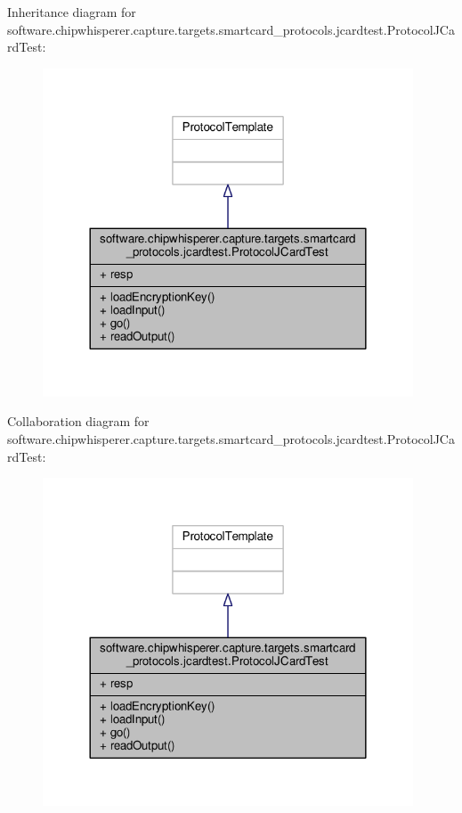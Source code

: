 Inheritance diagram for software.\+chipwhisperer.\+capture.\+targets.\+smartcard\+\_\+protocols.\+jcardtest.\+Protocol\+J\+Card\+Test\+:\nopagebreak
\begin{figure}[H]
\begin{center}
\leavevmode
\includegraphics[width=312pt]{d3/dae/classsoftware_1_1chipwhisperer_1_1capture_1_1targets_1_1smartcard__protocols_1_1jcardtest_1_1ProtocolJCardTest__inherit__graph}
\end{center}
\end{figure}


Collaboration diagram for software.\+chipwhisperer.\+capture.\+targets.\+smartcard\+\_\+protocols.\+jcardtest.\+Protocol\+J\+Card\+Test\+:\nopagebreak
\begin{figure}[H]
\begin{center}
\leavevmode
\includegraphics[width=312pt]{d5/d24/classsoftware_1_1chipwhisperer_1_1capture_1_1targets_1_1smartcard__protocols_1_1jcardtest_1_1ProtocolJCardTest__coll__graph}
\end{center}
\end{figure}


